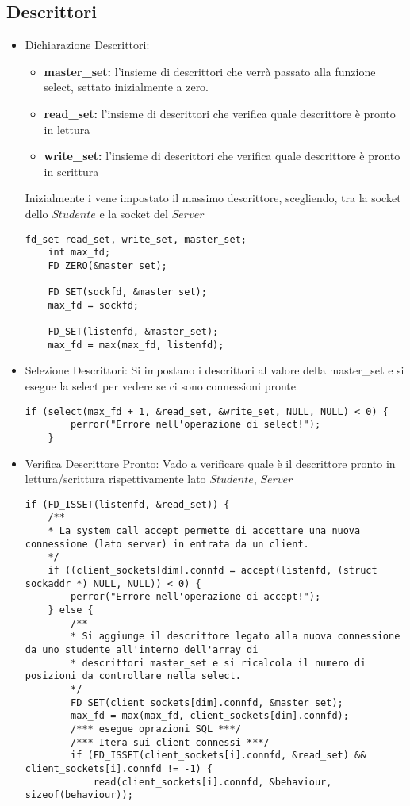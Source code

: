 \subsection{Descrittori}
\begin{itemize}
\item Dichiarazione Descrittori:
\begin{itemize}
	Identifico 3 set di descrittori:
	\item \textbf{master\_set: } l'insieme di descrittori che verrà passato alla funzione select, settato inizialmente a zero.
	\item \textbf{read\_set: } l'insieme di descrittori che
	verifica quale descrittore è pronto in lettura
	\item \textbf{write\_set: } l'insieme di descrittori che
	verifica quale descrittore è pronto in scrittura\\
\end{itemize}
Inizialmente i vene impostato il massimo descrittore, scegliendo, tra la socket dello $Studente$ e la socket del $Server$
\begin{lstlisting}[caption=Codice Descrittori, label=lst:cd]
	fd_set read_set, write_set, master_set;
	int max_fd;
	FD_ZERO(&master_set);
	
	FD_SET(sockfd, &master_set);
	max_fd = sockfd;
	
	FD_SET(listenfd, &master_set);
	max_fd = max(max_fd, listenfd);
\end{lstlisting}
\newpage
\item Selezione Descrittori:
Si impostano i descrittori al valore della master\_set e si esegue la select per vedere se ci sono connessioni pronte
\begin{lstlisting}[caption=Codice Descrittori Select, label=lst:cds]
	if (select(max_fd + 1, &read_set, &write_set, NULL, NULL) < 0) {
		perror("Errore nell'operazione di select!");
	}
\end{lstlisting}
\item Verifica Descrittore Pronto:
Vado a verificare quale è il descrittore pronto in lettura/scrittura rispettivamente lato $Studente$, $Server$
 \begin{lstlisting}[caption=Codice Accettazione Studente - Lettura Scelta Studente, label=lst:caslss]
  if (FD_ISSET(listenfd, &read_set)) {
 	/**
 	* La system call accept permette di accettare una nuova connessione (lato server) in entrata da un client.
 	*/
 	if ((client_sockets[dim].connfd = accept(listenfd, (struct sockaddr *) NULL, NULL)) < 0) {
 		perror("Errore nell'operazione di accept!");
 	} else {
 		/**
 		* Si aggiunge il descrittore legato alla nuova connessione da uno studente all'interno dell'array di
 		* descrittori master_set e si ricalcola il numero di posizioni da controllare nella select.
 		*/
 		FD_SET(client_sockets[dim].connfd, &master_set);
 		max_fd = max(max_fd, client_sockets[dim].connfd);
 		/*** esegue oprazioni SQL ***/
 		/*** Itera sui client connessi ***/
 		if (FD_ISSET(client_sockets[i].connfd, &read_set) && client_sockets[i].connfd != -1) {
 			read(client_sockets[i].connfd, &behaviour, sizeof(behaviour));
 \end{lstlisting}
 
\end{itemize}




